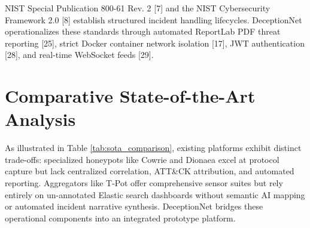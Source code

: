 \documentclass[12pt,a4paper]{report}
\begin{document}
NIST Special Publication 800-61 Rev. 2 [7] and the NIST Cybersecurity Framework 2.0 [8] establish structured incident handling lifecycles. DeceptionNet operationalizes these standards through automated ReportLab PDF threat reporting [25], strict Docker container network isolation [17], JWT authentication [28], and real-time WebSocket feeds [29].

\section{Comparative State-of-the-Art Analysis}

\begin{table}[H]
\centering
\caption{Comparative Analysis: DeceptionNet vs. Existing Deception Platforms}
\label{tab:sota_comparison}
\end{table}

As illustrated in Table \ref{tab:sota_comparison}, existing platforms exhibit distinct trade-offs: specialized honeypots like Cowrie and Dionaea excel at protocol capture but lack centralized correlation, ATT\&CK attribution, and automated reporting. Aggregators like T-Pot offer comprehensive sensor suites but rely entirely on un-annotated Elastic search dashboards without semantic AI mapping or automated incident narrative synthesis. DeceptionNet bridges these operational components into an integrated prototype platform.
\end{document}

